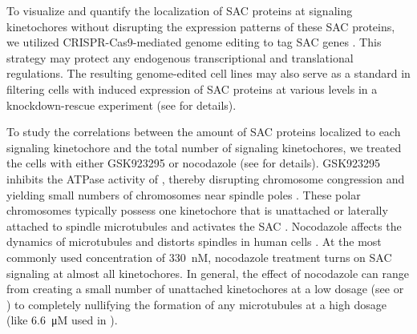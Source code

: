 To visualize and quantify the localization of SAC proteins at signaling kinetochores without disrupting the expression patterns of these SAC proteins, we utilized CRISPR-Cas9-mediated genome editing to tag SAC genes  \cite{CRISPRProtocol}. This strategy may protect any endogenous transcriptional and translational regulations. The resulting genome-edited cell lines may also serve as a standard in filtering cells with induced expression of SAC proteins at various levels in a knockdown-rescue experiment (see  for details).

To study the correlations between the amount of SAC proteins localized to each signaling kinetochore and the total number of signaling kinetochores, we treated the cells with either GSK923295 or nocodazole (see  for details). GSK923295 inhibits the ATPase activity of , thereby disrupting chromosome congression and yielding small numbers of chromosomes near spindle poles \cite{GSK923295}. These polar chromosomes typically possess one kinetochore that is unattached or laterally attached to spindle microtubules and activates the SAC \cite{GSK923295MonastrolCotreatment, GSK923295LateralAttachmentEM, LateralAttachmentSAC}. Nocodazole affects the dynamics of microtubules and distorts spindles in human cells \cite{TypeIIISpindle_330nMNoc, RZZ-MAD1vsBUB1-MAD1_2015}. At the most commonly used concentration of \SI{330}{nM}, nocodazole treatment turns on SAC signaling at almost all kinetochores. In general, the effect of nocodazole can range from creating a small number of unattached kinetochores at a low dosage (see \cite{Ablation, RZZ-MAD1vsBUB1-MAD1_2015} or ) to completely nullifying the formation of any microtubules at a high dosage (like \SI{6.6}{\micro M} used in ).